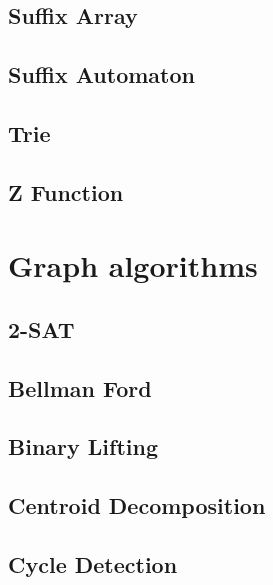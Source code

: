 \subsection{Suffix Array}
\raggedbottom
\hrulefill
\subsection{Suffix Automaton}
\raggedbottom
\hrulefill
\subsection{Trie}
\raggedbottom
\hrulefill
\subsection{Z Function}
\raggedbottom
\hrulefill

\section{Graph algorithms}
\subsection{2-SAT}
\raggedbottom
\hrulefill
\subsection{Bellman Ford}
\raggedbottom
\hrulefill
\subsection{Binary Lifting}
\raggedbottom
\hrulefill
\subsection{Centroid Decomposition}
\raggedbottom
\hrulefill
\subsection{Cycle Detection}
\raggedbottom
\hrulefill
